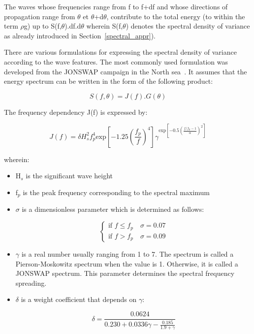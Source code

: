 The waves whose frequencies range from f to f+df and whose directions of
propagation range from $\theta$ et $\theta$+d$\theta$, contribute to the total
energy (to within the term $\rho$g) up to S(f,$\theta$).df.d$\theta$ wherein
S(f,$\theta$) denotes the spectral density of variance as already introduced in
Section~\ref{spectral_appr}).

There are various formulations for expressing the spectral density of variance
according to the wave features. The most commonly used formulation was
developed from the JONSWAP campaign in the North sea~\cite{Hasselman}. It
assumes that the energy spectrum can be written in the form of the following
product:

\begin{equation}
  S(f,\theta) = J(f).G(\theta)
  \label{3.63}
\end{equation}

The frequency dependency J(f) is expressed by:

\begin{equation}
  J(f) = \delta H^2_s f_p^4 \text{exp}\left[-1.25\left(\frac{f_p}{f}\right)^4\right] \gamma^{\text{exp}\left[-0.5\left(\frac{f/f_p -1}{\alpha}\right)^2\right]}
  \label{3.64}
\end{equation}

wherein:
\begin{itemize}
  \item H${}_{s}$ is the significant wave height

  \item f${}_{p}$ is the peak frequency corresponding to the spectral maximum

  \item $\sigma$ is a dimensionless parameter which is determined as follows:

    \[
      \left\{
      \begin{matrix}
        \text{if } f \leq f_p \quad \sigma = 0.07\\
        \text{if } f > f_p \quad \sigma = 0.09
      \end{matrix}
      \right.
      \]

  \item $\gamma$ is a real number usually ranging from 1 to 7. The spectrum is
    called a Pierson-Moskowitz spectrum when the value is 1. Otherwise, it is
    called a JONSWAP spectrum. This parameter determines the spectral frequency
    spreading.

  \item $\delta$ is a weight coefficient that depends on $\gamma$:

    \[ \delta = \frac{0.0624}{0.230+0.0336\gamma-\frac{0.185}{1.9+\gamma}} \]

\end{itemize}


